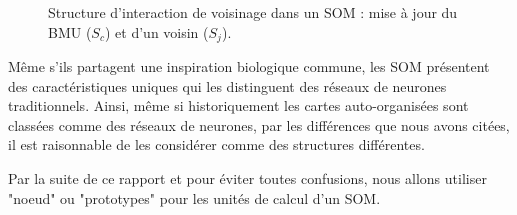 \documentclass[12pt,a4paper]{report}
\begin{document}
\begin{figure}[H]
\centering
{}
\caption{Structure d'interaction de voisinage dans un SOM : mise à jour du BMU ($S_c$) et d'un voisin ($S_j$).}
\label{fig:noeudSOM_voisinage}
\end{figure}

Même s'ils partagent une inspiration biologique commune, les SOM présentent des caractéristiques uniques qui les distinguent des réseaux de neurones traditionnels.
Ainsi, même si historiquement les cartes auto-organisées sont classées comme des réseaux de neurones, par les différences que nous avons citées,
il est raisonnable de les considérer comme des structures différentes. 

Par la suite de ce rapport et pour éviter toutes confusions, nous allons utiliser "noeud" ou "prototypes" pour les unités de calcul d'un SOM.
\end{document}
